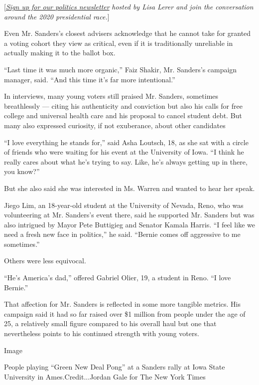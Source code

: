 {[}\href{https://www.nytimes3xbfgragh.onion/newsletters/politics?smid=rd?action=click\&module=Intentional\&pgtype=Article}{\emph{Sign
up for our politics newsletter}} \emph{hosted by Lisa Lerer and join the
conversation around the 2020 presidential race.}{]}

Even Mr. Sanders's closest advisers acknowledge that he cannot take for
granted a voting cohort they view as critical, even if it is
traditionally unreliable in actually making it to the ballot box.

``Last time it was much more organic,'' Faiz Shakir, Mr. Sanders's
campaign manager, said. ``And this time it's far more intentional.''

In interviews, many young voters still praised Mr. Sanders, sometimes
breathlessly --- citing his authenticity and conviction but also his
calls for free college and universal health care and his proposal to
cancel student debt. But many also expressed curiosity, if not
exuberance, about other candidates

``I love everything he stands for,'' said Asha Loutsch, 18, as she sat
with a circle of friends who were waiting for his event at the
University of Iowa. ``I think he really cares about what he's trying to
say. Like, he's always getting up in there, you know?''

But she also said she was interested in Ms. Warren and wanted to hear
her speak.

Jiego Lim, an 18-year-old student at the University of Nevada, Reno, who
was volunteering at Mr. Sanders's event there, said he supported Mr.
Sanders but was also intrigued by Mayor Pete Buttigieg and Senator
Kamala Harris. ``I feel like we need a fresh new face in politics,'' he
said. ``Bernie comes off aggressive to me sometimes.''

Others were less equivocal.

``He's America's dad,'' offered Gabriel Olier, 19, a student in Reno.
``I love Bernie.''

That affection for Mr. Sanders is reflected in some more tangible
metrics. His campaign said it had so far raised over \$1 million from
people under the age of 25, a relatively small figure compared to his
overall haul but one that nevertheless points to his continued strength
with young voters.

Image

People playing ``Green New Deal Pong'' at a Sanders rally at Iowa State
University in Ames.Credit...Jordan Gale for The New York Times


